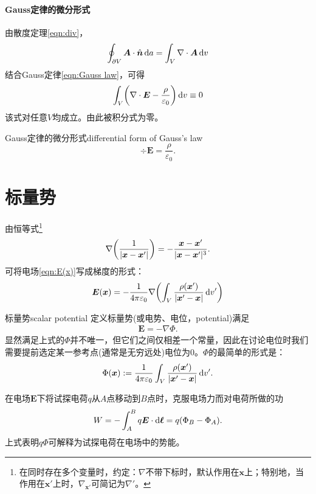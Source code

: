 \paragraph{Gauss定律的微分形式}

由散度定理\eqref{eqn:div}，
\[
    \oint_{\partial V}\bm A\cdot\mathop{}\!\hat{\bm{n}}\mathop{}\!\mathrm{d} a=\int_V\nabla\cdot\bm A\mathop{}\!\mathrm{d} v
\]
结合Gauss定律\eqref{eqn:Gauss law}，可得
\[
    \int_V\biggl(\nabla\cdot\bm E-\frac\rho{\varepsilon_0}\biggr)\mathop{}\!\mathrm{d} v\equiv 0
\]
该式对任意$V$均成立。由此被积分式为零。
\begin{theorem}{Gauss定律的微分形式}{differential form of Gauss's law}
    \begin{equation}
        \label{eqn:divE}
        \div\bm E=\frac\rho{\varepsilon_0}.
    \end{equation}
\end{theorem}

\section{标量势}

由恒等式\footnote{在同时存在多个变量时，约定：$\nabla$不带下标时，默认作用在$\bm x$上；特别地，当作用在$\bm x'$上时，$\nabla_{\bm x'}$可简记为$\nabla'$。}
\[
    \nabla\biggl(\frac1{|\bm x-\bm x'|}\biggr)=-\frac{\bm x-\bm x'}{|\bm x-\bm x'|^3}.
\]
可将电场\eqref{eqn:E(x)}写成梯度的形式：
\[
    \bm E(\bm x)=-\frac1{4\pi\varepsilon_0}\nabla\biggl(\int_V\frac{\rho(\bm x')}{|\bm x'-\bm x|}\mathop{}\!\mathrm{d} v'\biggr)
\]
\begin{definition}{标量势}{scalar potential}
    定义标量势(或电势、电位，potential)满足
    \begin{align}
        \label{eqn:gradPhi}
        \bm E=-\nabla\Phi.
    \end{align}
    显然满足上式的$\Phi$并不唯一，但它们之间仅相差一个常量，因此在讨论电位时我们需要提前选定某一参考点(通常是无穷远处)电位为0。$\Phi$的最简单的形式是：
    \begin{align}
        \label{eqn:Phi-rho}
        \Phi(\bm x):=\frac1{4\pi\varepsilon_0}\int_V\frac{\rho(\bm x')}{|\bm x'-\bm x|}\mathop{}\!\mathrm{d} v'.
    \end{align}
\end{definition}

\begin{corollary}
    在电场$\bm E$下将试探电荷$q$从$A$点移动到$B$点时，克服电场力而对电荷所做的功
    \[
        W=-\int_A^Bq\bm E\cdot\mathop{}\!\mathrm{d}\bm\ell=q(\Phi_B-\Phi_A).
    \]
    上式表明$q\Phi$可解释为试探电荷在电场中的势能。
\end{corollary}

